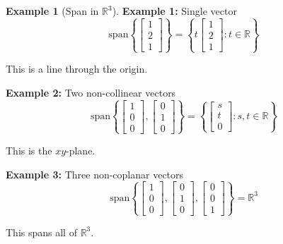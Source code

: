 \documentclass[12pt,a4paper]{article}
\theoremstyle{definition}
\newtheorem{example}{Example}[section]
\begin{document}
\begin{example}[Span in $\mathbb{R}^3$]
\textbf{Example 1:} Single vector
\begin{equation}
\text{span}\left\{\begin{bmatrix} 1 \\ 2 \\ 1 \end{bmatrix}\right\} = \left\{t\begin{bmatrix} 1 \\ 2 \\ 1 \end{bmatrix} : t \in \mathbb{R}\right\}
\end{equation}

This is a line through the origin.

\textbf{Example 2:} Two non-collinear vectors
\begin{equation}
\text{span}\left\{\begin{bmatrix} 1 \\ 0 \\ 0 \end{bmatrix}, \begin{bmatrix} 0 \\ 1 \\ 0 \end{bmatrix}\right\} = \left\{\begin{bmatrix} s \\ t \\ 0 \end{bmatrix} : s, t \in \mathbb{R}\right\}
\end{equation}

This is the $xy$-plane.

\textbf{Example 3:} Three non-coplanar vectors
\begin{equation}
\text{span}\left\{\begin{bmatrix} 1 \\ 0 \\ 0 \end{bmatrix}, \begin{bmatrix} 0 \\ 1 \\ 0 \end{bmatrix}, \begin{bmatrix} 0 \\ 0 \\ 1 \end{bmatrix}\right\} = \mathbb{R}^3
\end{equation}

This spans all of $\mathbb{R}^3$.
\end{example}
\end{document}
